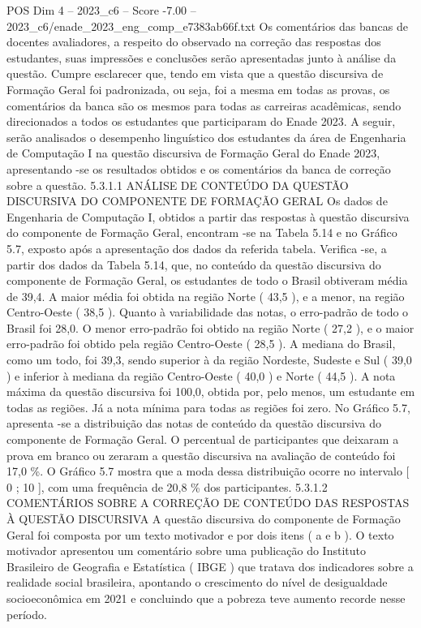 \begin{textsample}{POS Dim 4 – 2023\_c6 – Score -7.00 – 2023\_c6/enade\_2023\_eng\_comp\_e7383ab66f.txt}
Os comentários das bancas de docentes avaliadores, a respeito do observado na correção das respostas dos estudantes, suas impressões e conclusões serão apresentadas junto à análise da questão.
Cumpre esclarecer que, tendo em vista que a questão discursiva de Formação Geral foi padronizada, ou seja, foi a mesma em todas as provas, os comentários da banca são os mesmos para todas as carreiras acadêmicas, sendo direcionados a todos os estudantes que participaram do Enade 2023.
A seguir, serão analisados o desempenho linguístico dos estudantes da área de Engenharia de Computação I na questão discursiva de Formação Geral do Enade 2023, apresentando -se os resultados obtidos e os comentários da banca de correção sobre a questão. 5.3.1.1 ANÁLISE DE CONTEÚDO DA QUESTÃO DISCURSIVA DO COMPONENTE DE FORMAÇÃO GERAL Os dados de Engenharia de Computação I, obtidos a partir das respostas à questão discursiva do componente de Formação Geral, encontram -se na Tabela 5.14 e no Gráfico 5.7, exposto após a apresentação dos dados da referida tabela.
Verifica -se, a partir dos dados da Tabela 5.14, que, no conteúdo da questão discursiva do componente de Formação Geral, os estudantes de todo o Brasil obtiveram média de 39,4.
A maior média foi obtida na região Norte ( 43,5 ), e a menor, na região Centro-Oeste ( 38,5 ).
Quanto à variabilidade das notas, o erro-padrão de todo o Brasil foi 28,0.
O menor erro-padrão foi obtido na região Norte ( 27,2 ), e o maior erro-padrão foi obtido pela região Centro-Oeste ( 28,5 ).
A mediana do Brasil, como um todo, foi 39,3, sendo superior à da região Nordeste, Sudeste e Sul ( 39,0 ) e inferior à mediana da região Centro-Oeste ( 40,0 ) e Norte ( 44,5 ).
A nota máxima da questão discursiva foi 100,0, obtida por, pelo menos, um estudante em todas as regiões.
Já a nota mínima para todas as regiões foi zero.
No Gráfico 5.7, apresenta -se a distribuição das notas de conteúdo da questão discursiva do componente de Formação Geral.
O percentual de participantes que deixaram a prova em branco ou zeraram a questão discursiva na avaliação de conteúdo foi 17,0 \%.
O Gráfico 5.7 mostra que a moda dessa distribuição ocorre no intervalo [ 0 ; 10 ], com uma frequência de 20,8 \% dos participantes. 5.3.1.2 COMENTÁRIOS SOBRE A CORREÇÃO DE CONTEÚDO DAS RESPOSTAS À QUESTÃO DISCURSIVA A questão discursiva do componente de Formação Geral foi composta por um texto motivador e por dois itens ( a e b ).
O texto motivador apresentou um comentário sobre uma publicação do Instituto Brasileiro de Geografia e Estatística ( IBGE ) que tratava dos indicadores sobre a realidade social brasileira, apontando o crescimento do nível de desigualdade socioeconômica em 2021 e concluindo que a pobreza teve aumento recorde nesse período.

\end{textsample}
